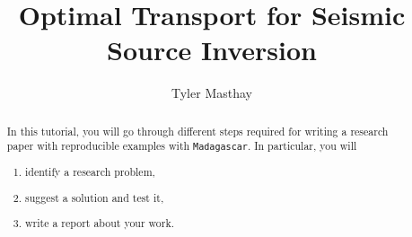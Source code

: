 \author{Tyler Masthay}
\title{Optimal Transport for Seismic Source Inversion}

\maketitle

\begin{abstract}
  In this tutorial, you will go through different steps required for writing a research paper with reproducible examples with \texttt{Madagascar}. In particular, you will
  \begin{enumerate}
    \item identify a research problem,
    \item suggest a solution and test it,
    \item write  a report about your work.
  \end{enumerate}
\end{abstract}






